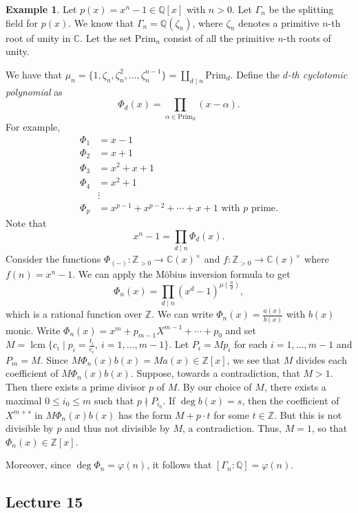 \documentclass[10pt,letterpaper,cm]{nupset}
\theoremstyle{definition}
\newtheorem{exmp}[definition]{Example}
\theoremstyle{theorem}
\theoremstyle{remark}
\newcommand{\C}{\mathbb C}
\newcommand{\Q}{\mathbb Q}
\newcommand{\Z}{\mathbb Z}
\newcommand{\1}{\mathbf{1}}
\newcommand{\0}{\vec 0}
\DeclareMathOperator{\lcm}{lcm}
\begin{document}
\begin{exmp}
Let $p(x)= x^n -1 \in \Q[x]$ with $n>0$. Let $\Gamma_n$ be the splitting field for $p(x)$. We know that $\Gamma_n = \Q(\zeta_n)$, where $\zeta_n$ denotes a primitive $n$-th root of unity in $\C$. Let the set $\text{Prim}_n$ consist of all the primitive $n$-th roots of unity. 

We have that $\mu_n = \{1, \zeta_n, \zeta_n^2, \ldots, \zeta_n^{n-1}\} =\coprod_{d\mid n} \text{Prim}_d$. Define the \textit{$d$-th cyclotomic polynomial} as $$\Phi_d(x) = \prod_{\alpha \in \text{Prim}_d}(x-\alpha).$$ 
For example,
\begin{align*}
\Phi_1 & = x-1
\\ \Phi_2 & = x+1
\\ \Phi_3 & = x^2 + x+1
\\ \Phi_4 & =  x^2+1
\\ & \vdots
\\ \Phi_p & = x^{p-1}+x^{p-2}+\cdots + x + 1 \text{ with } p \text{ prime.}
\end{align*}
Note that $$ x^n-1 =\prod_{d\mid n}\Phi_d(x)   .$$ Consider the functions $\Phi_{(-)}:\Z_{>0} \to \C(x)^{\times}$ and $f: \Z_{>0} \to \C(x)^{\times}$ where $f(n) = x^n-1$. We can apply the  M\"{o}bius inversion formula to get $$ \Phi_n(x) = \prod_{d\mid n}(x^d -1)^{\mu\left(\frac{n}{d}\right)} ,$$ which is a rational function over $\Z$. We can write $\Phi_n(x) = \frac{a(x)}{b(x)}$ with $b(x)$ monic. Write $\Phi_n(x) = x^m + p_{m-1}X^{m-1} + \cdots + p_0$ and set $M = \lcm\{c_i \mid p_i = \frac{t_i}{c_i}, \ i=1, \ldots, m-1\}$. Let $P_i = Mp_i$ for each $i=1, \ldots, m-1$ and $P_m = M$. Since $ M\Phi_n(x)b(x) =Ma(x)\in \Z[x]$,  we see that $M$ divides each coefficient of $M\Phi_n(x)b(x)$. Suppose, towards a contradiction, that $M >1$. Then there exists a prime divisor $p$ of $M$. By our choice of $M$, there exists a maximal $0\leq i_0 \leq m$ such that $p \nmid P_{i_0}$. If $\deg{b(x)} =s$, then the coefficient of $X^{m+s}$ in $M\Phi_n(x)b(x)$ has the form $M + p \cdot t$ for some $t\in \Z$. But this is not divisible by $p$ and thus not divisible by $M$, a contradiction.   Thus, $M =1$, so that $\Phi_n(x) \in \Z[x]$. 

Moreover, since $\deg{\Phi_n}= \varphi(n)$, it follows that $[\Gamma_n : \Q] = \varphi(n)$.
\end{exmp}

\subsection{Lecture 15}
\end{document}
